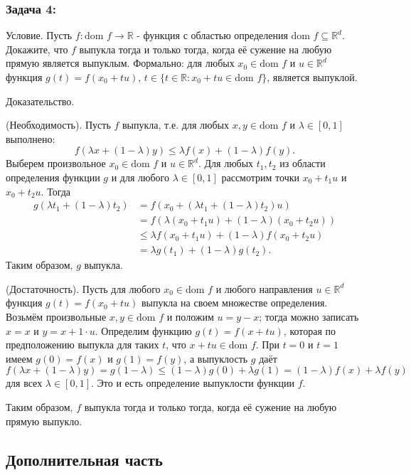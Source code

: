 \documentclass[a4paper,12pt]{article}
\begin{document}
	\subsubsection*{Задача 4:}
	
	Условие. Пусть $f: \text{dom } f \rightarrow \mathbb{R}$ - функция с областью определения $\text{dom } f \subseteq \mathbb{R}^d$. Докажите, что $f$ выпукла тогда и только тогда, когда её сужение на любую прямую является выпуклым. Формально: для любых $x_0 \in \text{dom } f$ и $u \in \mathbb{R}^d$ функция $g(t) = f(x_0 + tu)$, $t \in \{t \in \mathbb{R} : x_0 + tu \in \text{dom } f\}$, является выпуклой.
	
	Доказательство.
	
	(Необходимость). Пусть $f$ выпукла, т.е. для любых $x, y \in \text{dom } f$ и $\lambda \in [0, 1]$ выполнено:
	$$
	f(\lambda x + (1 - \lambda) y) \le \lambda f(x) + (1 - \lambda) f(y).
	$$
	Выберем произвольное $x_0 \in \text{dom } f$ и $u \in \mathbb{R}^d$. Для любых $t_1, t_2$ из области определения функции $g$ и для любого $\lambda \in [0, 1]$ рассмотрим точки $x_0 + t_1 u$ и $x_0 + t_2 u$. Тогда
	\begin{align*}
		g(\lambda t_1 + (1 - \lambda) t_2) &= f(x_0 + (\lambda t_1 + (1 - \lambda) t_2) u) \\
		&= f(\lambda(x_0 + t_1 u) + (1 - \lambda)(x_0 + t_2 u)) \\
		&\le \lambda f(x_0 + t_1 u) + (1 - \lambda) f(x_0 + t_2 u) \\
		&= \lambda g(t_1) + (1 - \lambda) g(t_2).
	\end{align*}
	Таким образом, $g$ выпукла.
	
	(Достаточность). Пусть для любого $x_0 \in \text{dom } f$ и любого направления $u \in \mathbb{R}^d$ функция $g(t) = f(x_0 + tu)$ выпукла на своем множестве определения. Возьмём произвольные $x, y \in \text{dom } f$ и положим $u = y - x$; тогда можно записать $x = x$ и $y = x + 1 \cdot u$. Определим функцию $g(t) = f(x + tu)$, которая по предположению выпукла для таких $t$, что $x + tu \in \text{dom } f$. При $t = 0$ и $t = 1$ имеем $g(0) = f(x)$ и $g(1) = f(y)$, а выпуклость $g$ даёт
	$$
	f(\lambda x + (1 - \lambda) y) = g(1 - \lambda) \le (1 - \lambda) g(0) + \lambda g(1) = (1 - \lambda) f(x) + \lambda f(y)
	$$
	для всех $\lambda \in [0, 1]$. Это и есть определение выпуклости функции $f$.
	
	Таким образом, $f$ выпукла тогда и только тогда, когда её сужение на любую прямую выпукло.
	
	\subsection*{Дополнительная часть}
	
\end{document}
